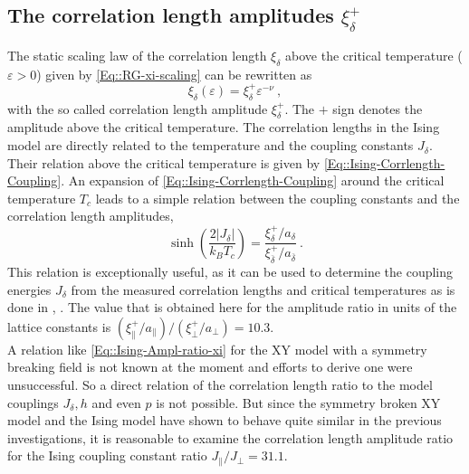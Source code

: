 	\subsection{The correlation length amplitudes $\xi_\delta^+$}
	The static scaling law of the correlation length $\xi_\delta$ above the critical temperature ($\varepsilon > 0$) given by \autoref{Eq::RG-xi-scaling} can be rewritten as
	\begin{equation} \label{Eq::Xi-divergence-amplitude}
		\xi_\delta (\varepsilon) = \xi_\delta^{+} \varepsilon^{-\nu}~,
	\end{equation}
	with the so called correlation length amplitude $\xi_\delta^{+}$. The $+$ sign denotes the amplitude above the critical temperature. The correlation lengths in the Ising model are directly related to the temperature and the coupling constants $J_\delta$. Their relation above the critical temperature is given by \autoref{Eq::Ising-Corrlength-Coupling}. An expansion of \autoref{Eq::Ising-Corrlength-Coupling} around the critical temperature $T_c$ leads to a simple relation between the coupling constants and the correlation length amplitudes,
	\begin{equation} \label{Eq::Ising-Ampl-ratio-xi}
		\sinh \left(\frac{2 |J_\delta|}{k_B T_c}\right) =	\frac{\xi_\delta^+ / a_\delta}{\xi_{\overline{\delta}}^+ / a_{\overline{\delta}}}~.
	\end{equation}
	This relation is exceptionally useful, as it can be used to determine the coupling energies $J_\delta$ from the measured correlation lengths and critical temperatures as is done in \cite{brand2023dimer}, \cite{brand2023critical}. The value that is obtained here for the amplitude ratio in units of the lattice constants is $({\xi_\parallel^+ / a_\parallel}) \big/	({\xi_{\perp}^+ / a_{\perp}}) =	10.3$.  \\
	
	A relation like \autoref{Eq::Ising-Ampl-ratio-xi} for the XY model with a symmetry breaking field is not known at the moment and efforts to derive one were unsuccessful. So a direct relation of the correlation length ratio to the model couplings $J_\delta, h$ and even $p$ is not possible. But since the symmetry broken XY model and the Ising model have shown to behave quite similar in the previous investigations, it is reasonable to examine the correlation length amplitude ratio for the Ising coupling constant ratio $J_\parallel /	J_\perp =	31.1$. \\
	

